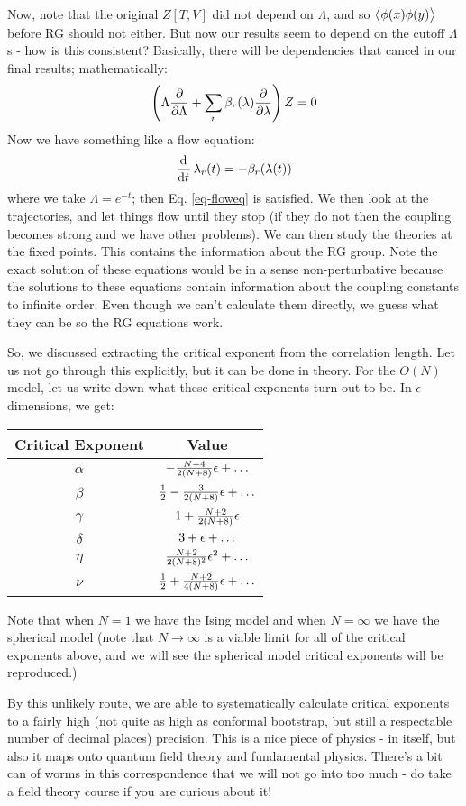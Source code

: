 Now, note that the original $Z[T, V]$ did not depend on $\Lambda$, and so $\avg{\phi(x)\phi(y)}$ before RG should not either. But now our results seem to depend on the cutoff $\Lambda$s - how is this consistent? Basically, there will be dependencies that cancel in our final results; mathematically:
\begin{equation}\label{eq-floweq}
    \left(\Lambda\frac{\partial }{\partial \Lambda} + \sum_r \beta_r(\lambda)\frac{\partial }{\partial \lambda}\right)Z = 0
\end{equation} 
Now we have something like a flow equation:
\begin{equation}
    \dod{}{t}\lambda_r(t) = -\beta_r(\lambda(t))
\end{equation}
where we take $\Lambda = e^{-t}$; then Eq. \eqref{eq-floweq} is satisfied. We then look at the trajectories, and let things flow until they stop (if they do not then the coupling becomes strong and we have other problems). We can then study the theories at the fixed points. This contains the information about the RG group. Note the exact solution of these equations would be in a sense non-perturbative because the solutions to these equations contain information about the coupling constants to infinite order. Even though we can't calculate them directly, we guess what they can be so the RG equations work.

So, we discussed extracting the critical exponent from the correlation length. Let us not go through this explicitly, but it can be done in theory. For the $O(N)$ model, let us write down what these critical exponents turn out to be. In $\epsilon$ dimensions, we get:
\begin{table}[htbp]
    \centering\begin{tabular}{|c|c|}
        \hline Critical Exponent & Value
        \\ \hline $\alpha$ & $-\frac{N-4}{2(N+8)}\epsilon + \ldots$
        \\ \hline $\beta$ & $\frac{1}{2} - \frac{3}{2(N+8)}\epsilon + \ldots$
        \\ \hline $\gamma$ & $1 + \frac{N+2}{2(N+8)}\epsilon$
        \\ \hline $\delta$ & $3 + \epsilon + \ldots$
        \\ \hline $\eta$ & $\frac{N+2}{2(N+8)^2}\epsilon^2 + \ldots$ 
        \\ \hline $\nu$ & $\frac{1}{2} + \frac{N+2}{4(N+8)}\epsilon + \ldots$
        \\ \hline
    \end{tabular}
\end{table}
Note that when $N = 1$ we have the Ising model and when $N = \infty$ we have the spherical model (note that $N \to \infty$ is a viable limit for all of the critical exponents above, and we will see the spherical model critical exponents will be reproduced.)

By this unlikely route, we are able to systematically calculate critical exponents to a fairly high (not quite as high as conformal bootstrap, but still a respectable number of decimal places) precision. This is a nice piece of physics - in itself, but also it maps onto quantum field theory and fundamental physics. There's a bit can of worms in this correspondence that we will not go into too much - do take a field theory course if you are curious about it!